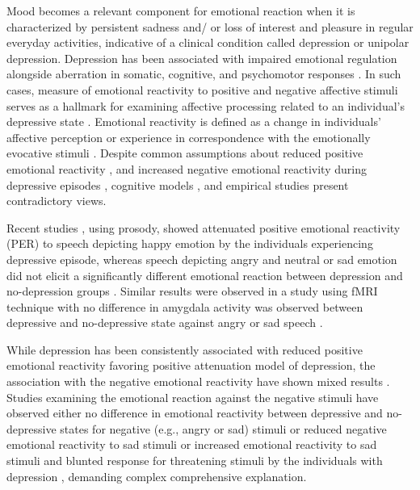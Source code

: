 \documentclass{Interspeech2024}
\begin{document}
Mood becomes a relevant component for emotional reaction when it is characterized by persistent sadness and/ or loss of interest and pleasure in regular everyday activities, indicative of a clinical condition called depression or unipolar depression. Depression has been associated with impaired emotional regulation alongside aberration in somatic, cognitive, and psychomotor responses \cite{Sheoran2022, First2013}. In such cases, measure of emotional reactivity to positive and negative affective stimuli serves as a hallmark for examining affective processing related to an individual's depressive state \cite{Sheoran2022, Bylsma2008, koch2018neural, schlipf2013judgment}.
Emotional reactivity is defined as a change in individuals’ affective perception or experience in correspondence with the emotionally evocative stimuli \cite{Sheoran2022, Bylsma2008}. Despite common assumptions about reduced positive emotional reactivity \cite{Bylsma2008, Beck2008}, and increased negative emotional reactivity during depressive episodes \cite{Beck2008},  cognitive models \cite{ Bylsma2008, Beck2008}, and empirical studies \cite{uekermann2008perception, schlipf2013judgment} present contradictory views.


Recent studies \cite{uekermann2008perception,  koch2018neural, schlipf2013judgment},  using prosody, showed attenuated positive emotional reactivity (PER) to speech depicting happy emotion by the individuals experiencing depressive episode, whereas speech depicting angry and neutral or sad emotion did not elicit a significantly different emotional reaction between depression and no-depression groups  \cite{uekermann2008perception, schlipf2013judgment}. Similar results were observed in a study using fMRI technique with no difference in amygdala activity was observed between depressive and no-depressive state against angry or sad speech \cite{koch2018neural}. 



While depression has been consistently associated with reduced positive emotional reactivity \cite{Sheoran2022, Bylsma2008} favoring positive attenuation model of depression, the association with the negative emotional reactivity  have shown mixed results \cite{Sheoran2022, schlipf2013judgment, Beck2008}. Studies examining the emotional reaction against the negative stimuli have observed either no difference in emotional reactivity between depressive and no-depressive states for negative (e.g., angry or sad) stimuli \cite{koch2018neural, schlipf2013judgment} or reduced negative emotional reactivity to sad stimuli \cite{Bylsma2008, Rottenberg2017} or increased emotional reactivity to sad stimuli and blunted response for threatening stimuli by the individuals with depression \cite{kujawa2017vulnerability}, demanding complex comprehensive explanation. 
\end{document}
